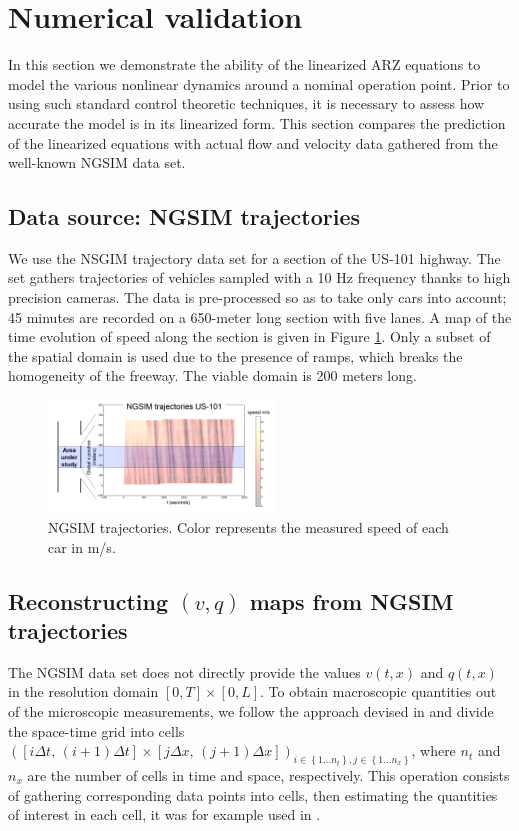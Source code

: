 \documentclass[a4paper, 10pt, conference]{ieeeconf}      %
\begin{document}
\section{Numerical validation}

In this section we demonstrate the ability of the linearized ARZ equations to model the various nonlinear dynamics around a nominal operation point. Prior to using such standard control theoretic techniques, it is necessary to assess how accurate the model is in its linearized form. This section compares the prediction of the linearized equations with actual flow
and velocity data gathered from the well-known NGSIM data set.


\subsection{Data source: NGSIM trajectories}

We use the NSGIM trajectory data set for a section of the US-101 highway. The set gathers trajectories of vehicles sampled with a 10 Hz frequency thanks to high precision cameras. The data is pre-processed so as to take only cars into account; 45 minutes are recorded on a 650-meter long section with five lanes. A map of the time evolution of speed along the section is given in Figure \ref{fig:NGSIM-trajectories}.
Only a subset of the spatial domain is used due to the presence of ramps, which breaks the homogeneity of the freeway. The viable domain is 200 meters long.

\begin{figure}
\centering
\includegraphics[width=6cm]{US-101_all_traj_low_res_mod}
\protect\caption{NGSIM trajectories. Color represents the measured speed of each
car in m/s.}
\label{fig:NGSIM-trajectories}
\end{figure}



\subsection{Reconstructing $(v,q)$ maps from NGSIM trajectories}

The NGSIM data set does not directly provide the values $v(t,x)$ and $q(t,x)$ in the resolution domain $\left[0,T\right]\times\left[0,L\right]$. To obtain macroscopic quantities out of the microscopic measurements, we follow the approach devised in \cite{edie1963discussion} and divide the space-time grid into cells $\left(\left[i\Delta t,\, \left(i+1\right)\Delta t\right]\times\left[j\Delta x, \, (j+1)\Delta x\right]\right)_{i\in\left\{ 1\ldots n_{t}\right\} ,j\in\left\{ 1\ldots n_{x}\right\} }$, where $n_t$ and $n_x$ are the number of cells in time and space, respectively. This operation consists of gathering corresponding data points into cells, then estimating the quantities of interest in each cell, it was for example used in \cite{Piccoli201532}. 
\end{document}

